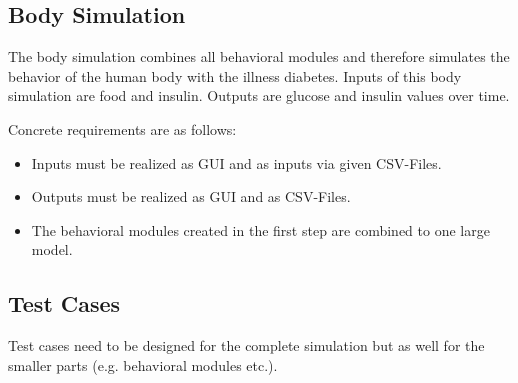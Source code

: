 \subsection{Body Simulation}
The body simulation combines all behavioral modules and therefore simulates the
behavior of the human body with the illness diabetes.
Inputs of this body simulation are food and insulin.
Outputs are glucose and insulin values over time.

Concrete requirements are as follows:
\begin{itemize}
  \item Inputs must be realized as GUI and as inputs via given CSV-Files.
  \item Outputs must be realized as GUI and as CSV-Files.
  \item The behavioral modules created in the first step are combined to one
  large model.
\end{itemize} 

\subsection{Test Cases}
Test cases need to be designed for the complete simulation but as well for the
smaller parts (e.g. behavioral modules etc.).